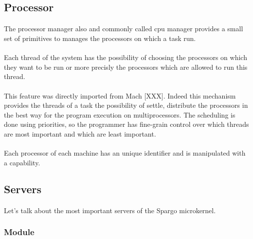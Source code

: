\documentclass[10pt,a4wide]{article}
\begin{document}
\begin{multicols}{2}
\subsection{Processor}

\paragraph{}

The processor manager also and commonly called cpu manager provides a small
set of primitives to manages the processors on which a task run.

\paragraph{}

Each thread of the system has the possibility of choosing the processors
on which they want to be run or more precisly the processors which are allowed
to run this thread.

\paragraph{}

This feature was directly imported from Mach [XXX]. Indeed this mechanism
provides the threads of a task the possibility of settle, distribute
the processors in the best way for the program execution on multiprocessors.
The scheduling is done using priorities, so the programmer has fine-grain
control over which threads are most important and which are least important.

\paragraph{}

Each processor of each machine has an unique identifier and is manipulated
with a capability.

\subsection{Servers}

\paragraph{}

Let's talk about the most important servers of the Spargo microkernel.

\subsubsection{Module}


\end{multicols}
\end{document}
